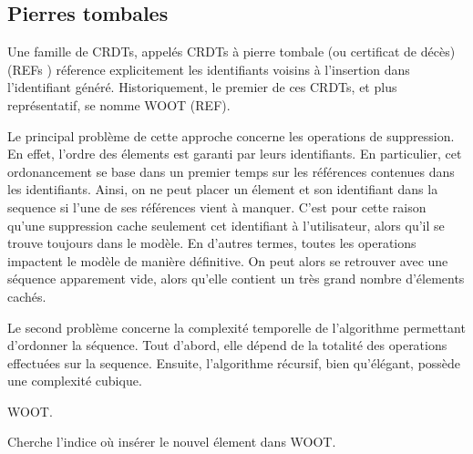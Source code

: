 \subsection{Pierres tombales}
Une famille de CRDTs, appelés CRDTs à pierre tombale (ou certificat de décès)
(REFs ) réference explicitement les identifiants voisins à l'insertion dans
l'identifiant généré. Historiquement, le premier de ces CRDTs, et plus
représentatif, se nomme WOOT (REF).

Le principal problème de cette approche concerne les operations de suppression.
En effet, l'ordre des élements est garanti par leurs identifiants. En
particulier, cet ordonancement se base dans un premier temps sur les références
contenues dans les identifiants. Ainsi, on ne peut placer un élement et son
identifiant dans la sequence si l'une de ses références vient à manquer. C'est
pour cette raison qu'une suppression cache seulement cet identifiant à
l'utilisateur, alors qu'il se trouve toujours dans le modèle. En d'autres
termes, toutes les operations impactent le modèle de manière définitive. On
peut alors se retrouver avec une séquence apparement vide, alors qu'elle
contient un très grand nombre d'élements cachés.

Le second problème concerne la complexité temporelle de l'algorithme permettant
d'ordonner la séquence. Tout d'abord, elle dépend de la totalité des operations
effectuées sur la sequence. Ensuite, l'algorithme récursif, bien qu'élégant,
possède une complexité cubique.

\begin{algorithm}
  
  \caption{\label{algo:woot}WOOT.}
\end{algorithm}

\begin{algorithm}
  
  \caption{\label{algo:wootrecurs}Cherche l'indice où insérer le nouvel
    élement dans WOOT.}
\end{algorithm}



